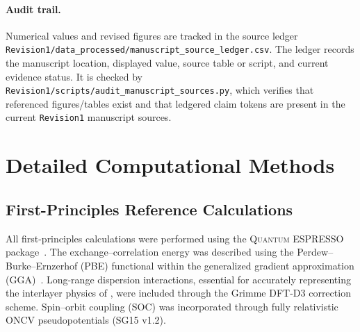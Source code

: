 \documentclass[pdflatex,sn-mathphys-num]{sn-jnl}%
\providecommand{\reviewermap}[3]{}
\theoremstyle{thmstyleone}%
\theoremstyle{thmstyletwo}%
\theoremstyle{thmstylethree}%
\begin{document}
\paragraph{Audit trail.}
\reviewermap{REV-C8/REV-C13}{done-local}{Added explicit source-ledger hook for numerical claims, figures, and tables.}
Numerical values and revised figures are tracked in the source ledger \texttt{Revision1/data\_processed/manuscript\_source\_ledger.csv}. The ledger records the manuscript location, displayed value, source table or script, and current evidence status. It is checked by \texttt{Revision1/scripts/audit\_manuscript\_sources.py}, which verifies that referenced figures/tables exist and that ledgered claim tokens are present in the current \texttt{Revision1} manuscript sources.


\newcommand{\pc}[1]{{\color{purple}[Paulette: #1]}}
\newcommand{\yi}[1]{{\color{orange!80}[Yi: #1]}}


\section{Detailed Computational Methods}
\subsection{First-Principles Reference Calculations}

All first-principles calculations were performed using the \textsc{Quantum ESPRESSO} package~\cite{giannozzi2009quantum}. The exchange–correlation energy was described using the Perdew–Burke–Ernzerhof (PBE) functional within the generalized gradient approximation (GGA)~\cite{perdew1996generalized}. Long-range dispersion interactions, essential for accurately representing the interlayer physics of , were included through the Grimme DFT-D3 correction scheme. Spin–orbit coupling (SOC) was incorporated through fully relativistic ONCV pseudopotentials (SG15 v1.2).
\end{document}
